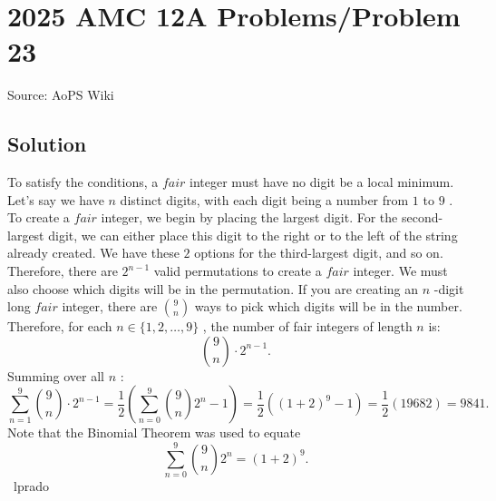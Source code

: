 \documentclass[12pt]{article}
\begin{document}
\section*{{2025 AMC 12A Problems/Problem 23}}
Source: AoPS Wiki

\subsection*{Solution}
To satisfy the conditions, a $\textit{fair}$ integer must have no digit be a local minimum. Let's say we have $n$ distinct digits, with each digit being a number from $1$ to $9$ . To create a $\textit{fair}$ integer, we begin by placing the largest digit. For the second-largest digit, we can either place this digit to the right or to the left of the string already created. We have these $2$ options for the third-largest digit, and so on. Therefore, there are $2^{n-1}$ valid permutations to create a $\textit{fair}$ integer. We must also choose which digits will be in the permutation. If you are creating an $n$ -digit long $\textit{fair}$ integer, there are $9\choose{n}$ ways to pick which digits will be in the number. Therefore, for each $n \in \{1,2,\dots, 9\}$ , the number of fair integers of length $n$ is: \[\binom{9}{n} \cdot 2^{n-1}.\] Summing over all $n$ : \[\sum_{n=1}^9{\binom{9}{n} \cdot 2^{n-1}}=\frac{1}{2}\left(\sum_{n=0}^9{\binom{9}{n}}2^n -1\right)=\frac{1}{2}\left((1+2)^9 -1 \right) = \frac{1}{2}(19682) = \boxed{9841}.\] Note that the Binomial Theorem was used to equate \[\sum_{n=0}^9{\binom{9}{n}}2^n = (1+2)^9.\] ~lprado
\end{document}
